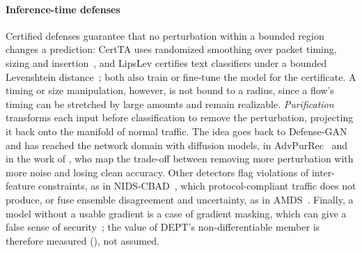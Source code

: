 \documentclass[acmtog,nonacm,pbalance]{acmart}
\begin{document}
\paragraph{Inference-time defenses} Certified defenses guarantee that no
perturbation within a bounded region changes a prediction: CertTA uses
randomized smoothing over packet timing, sizing and
insertion~\cite{yan2025certta}, and LipsLev certifies text classifiers under a
bounded Levenshtein distance~\cite{abad2025lipslev}; both also train or
fine-tune the model for the certificate. A timing or size
manipulation, however, is not bound to a radius, since a flow's timing can be
stretched by large amounts and remain realizable. \emph{Purification}
transforms each input before classification to remove the perturbation,
projecting it back onto the manifold of normal traffic. The idea goes back to
Defense-GAN~\cite{samangouei2018defense} and has reached the network domain with
diffusion models, in AdvPurRec~\cite{alhussien2024advpurrec} and in the work of
\citet{merzouk2024diffusion}, who map the trade-off between removing more
perturbation with more noise and losing clean accuracy. Other
detectors flag violations of inter-feature constraints, as in
NIDS-CBAD~\cite{kumar2025nids}, which protocol-compliant traffic does not
produce, or fuse ensemble disagreement and uncertainty, as in
AMDS~\cite{olukola2026amds}. Finally, a model without a usable gradient is a
case of gradient masking, which can give a false sense of
security~\cite{athalye2018obfuscated}; the value of DEPT's non-differentiable
member is therefore measured (), not assumed.
\end{document}

